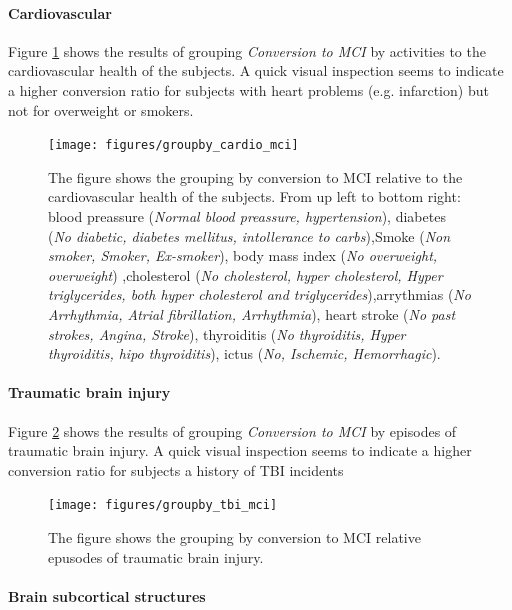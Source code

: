 \documentclass[11pt]{article}
\theoremstyle{definition}
\theoremstyle{remark}
\begin{document}
\paragraph*{Cardiovascular}
Figure \ref{fig:groupby_cardio_mci} shows the results of grouping \emph{Conversion to MCI} by activities to the cardiovascular health of the subjects. A quick visual inspection seems to indicate a higher conversion ratio for subjects with heart problems (e.g. infarction) but not for overweight or smokers.

\begin{figure}[H]
        \centering
        \texttt{[image: figures/groupby\_cardio\_mci]}
        \caption{The figure shows the grouping by conversion to MCI relative to the cardiovascular health of the subjects. From up left to bottom right: blood preassure (\emph{Normal blood preassure, hypertension}), diabetes (\emph{No diabetic, diabetes mellitus, intollerance to carbs}),Smoke (\emph{Non smoker, Smoker, Ex-smoker}), body mass index (\emph{No overweight, overweight}) ,cholesterol (\emph{No cholesterol, hyper cholesterol, Hyper triglycerides, both hyper cholesterol and triglycerides}),arrythmias (\emph{No Arrhythmia, Atrial fibrillation, Arrhythmia}), heart stroke (\emph{No past strokes, Angina, Stroke}), thyroiditis (\emph{No thyroiditis, Hyper thyroiditis, hipo thyroiditis}), ictus (\emph{No, Ischemic, Hemorrhagic}).}
        \label{fig:groupby_cardio_mci}
\end{figure}


\paragraph*{Traumatic brain injury}
Figure \ref{fig:groupby_tbi_mci} shows the results of grouping \emph{Conversion to MCI} by episodes of traumatic brain injury. A quick visual inspection seems to indicate a higher conversion ratio for subjects a history of TBI incidents

\begin{figure}[H]
        \centering
        \texttt{[image: figures/groupby\_tbi\_mci]}
        \caption{The figure shows the grouping by conversion to MCI relative epusodes of traumatic brain injury.}
        \label{fig:groupby_tbi_mci}
\end{figure}



\paragraph{Brain subcortical structures}
\end{document}
